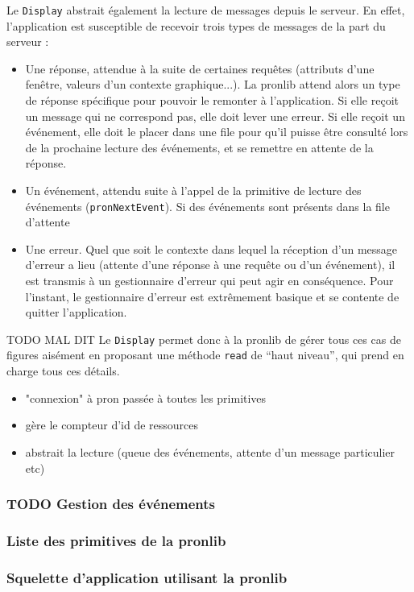 Le \verb|Display| abstrait également la lecture de messages depuis le serveur. En effet, l'application est susceptible de recevoir trois types de messages de la part du serveur :
\begin{itemize}
  \item Une réponse, attendue à la suite de certaines requêtes (attributs d'une fenêtre, valeurs d'un contexte graphique...). La pronlib attend alors un type de réponse spécifique pour pouvoir le remonter à l'application. Si elle reçoit un message qui ne correspond pas, elle doit lever une erreur. Si elle reçoit un événement, elle doit le placer dans une file pour qu'il puisse être consulté lors de la prochaine lecture des événements, et se remettre en attente de la réponse.
  \item Un événement, attendu suite à l'appel de la primitive de lecture des événements (\verb|pronNextEvent|). Si des événements sont présents dans la file d'attente
  \item Une erreur. Quel que soit le contexte dans lequel la réception d'un message d'erreur a lieu (attente d'une réponse à une requête ou d'un événement), il est transmis à un gestionnaire d'erreur qui peut agir en conséquence. Pour l'instant, le gestionnaire d'erreur est extrêmement basique et se contente de quitter l'application.
\end{itemize}

\vspace{1em}

TODO MAL DIT Le \verb|Display| permet donc à la pronlib de gérer tous ces cas de figures aisément en proposant une méthode \verb|read| de ``haut niveau'', qui prend en charge tous ces détails.

\begin{itemize}
  \item "connexion" à pron passée à toutes les primitives
  \item gère le compteur d'id de ressources
  \item abstrait la lecture (queue des événements, attente d'un message particulier etc)
\end{itemize}

\subsubsection{TODO Gestion des événements}

\subsubsection{Liste des primitives de la pronlib}



\subsubsection{Squelette d'application utilisant la pronlib}


